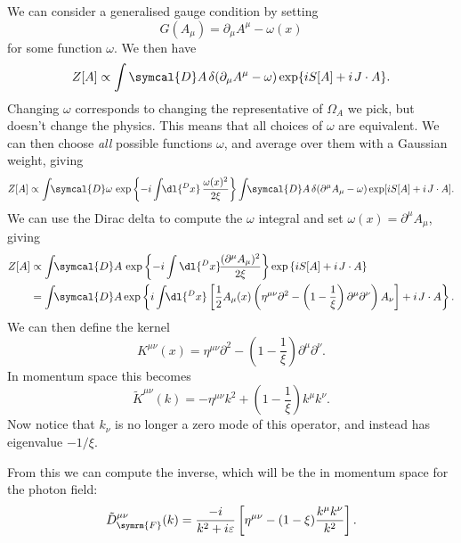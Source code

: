 \documentclass[fleqn]{NotesClass}
\newcommand{\minkowskiMetric}{\eta}
\newcommand{\dalembertian}{\partial^2}
\newcommand{\feynman}{\symrm{F}}
\newcommand{\DL}[1]{\symcal{D}#1}
\begin{document}
    We can consider a generalised gauge condition by setting
    \begin{equation}
        G(A_\mu) = \partial_\mu A^\mu - \omega(x)
    \end{equation}
    for some function \(\omega\).
    We then have
    \begin{equation}
        Z[A] \propto \int \DL{A} \, \delta(\partial_\mu A^\mu - \omega) \exp\{iS[A] + i \mkern2mu J \cdot A\}.
    \end{equation}
    Changing \(\omega\) corresponds to changing the representative of \(\Omega_A\) we pick, but doesn't change the physics.
    This means that all choices of \(\omega\) are equivalent.
    We can then choose \emph{all} possible functions \(\omega\), and average over them with a Gaussian weight, giving
    \begin{equation*}
        Z[A] \propto \int \!\! \DL{\omega} \, \exp\left\{ -i \int \!\! \dl{^Dx} \, \frac{\omega(x)^2}{2\xi} \right\} \int \!\! \DL{A} \, \delta(\partial^\mu A_\mu - \omega) \exp[iS[A] + i \mkern2mu J \cdot A].
    \end{equation*}
    We can use the Dirac delta to compute the \(\omega\) integral and set \(\omega(x) = \partial^\mu A_\mu\), giving
    \begin{align}
        Z[A] &\propto \int \!\! \DL{A} \, \exp\left\{ -i \int \dl{^Dx} \!\! \, \frac{(\partial^\mu A_\mu)^2}{2\xi} \right\} \exp\left\{ iS[A] + i \mkern2mu J \cdot A \right\}\\
        &= \int \!\! \DL{A} \exp \left\{ i \int \!\! \dl{^Dx} \left[ \frac{1}{2} A_\mu(x) \left( \minkowskiMetric^{\mu\nu} \dalembertian - \left( 1 - \frac{1}{\xi} \right) \partial^\mu \partial^\nu \right) A_\nu \right] + i \mkern2mu J \cdot A \right\}.\notag
    \end{align}
    We can then define the kernel
    \begin{equation}
        K^{\mu\nu}(x) = \minkowskiMetric^{\mu\nu}\dalembertian - \left( 1 - \frac{1}{\xi} \right) \partial^\mu \partial^\nu.
    \end{equation}
    In momentum space this becomes
    \begin{equation}
        \tilde{K}^{\mu\nu}(k) = -\minkowskiMetric^{\mu\nu}k^2 + \left( 1 - \frac{1}{\xi} \right) k^\mu k^\nu.
    \end{equation}
    Now notice that \(k_\nu\) is no longer a zero mode of this operator, and instead has eigenvalue \(-1/\xi\).
    
    From this we can compute the inverse, which will be the  in momentum space for the photon field:
    \begin{equation}
        \tilde{D}_{\feynman}^{\mu\nu}(k) = \frac{-i}{k^2 + i\varepsilon} \left[ \minkowskiMetric^{\mu\nu} - (1 - \xi) \frac{k^\mu k^\nu}{k^2} \right].
    \end{equation}
    
\end{document}
